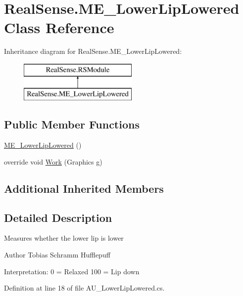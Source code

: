 \hypertarget{class_real_sense_1_1_m_e___lower_lip_lowered}{}\section{Real\+Sense.\+M\+E\+\_\+\+Lower\+Lip\+Lowered Class Reference}
\label{class_real_sense_1_1_m_e___lower_lip_lowered}
Inheritance diagram for Real\+Sense.\+M\+E\+\_\+\+Lower\+Lip\+Lowered\+:\begin{figure}[H]
\begin{center}
\leavevmode
\includegraphics[height=2.000000cm]{class_real_sense_1_1_m_e___lower_lip_lowered}
\end{center}
\end{figure}
\subsection*{Public Member Functions}
\begin{DoxyCompactItemize}
\item 
\hyperlink{class_real_sense_1_1_m_e___lower_lip_lowered_a22e97475320ef8a737cc1ce83dc0f93f}{M\+E\+\_\+\+Lower\+Lip\+Lowered} ()
\item 
override void \hyperlink{class_real_sense_1_1_m_e___lower_lip_lowered_a9b88f1f4e25e5330a561edbaf307889b}{Work} (Graphics g)
\end{DoxyCompactItemize}
\subsection*{Additional Inherited Members}


\subsection{Detailed Description}
Measures whether the lower lip is lower \begin{DoxyAuthor}{Author}
Tobias Schramm  Hufflepuff
\end{DoxyAuthor}
Interpretation\+: 0 = Relaxed 100 = Lip down 

Definition at line 18 of file A\+U\+\_\+\+Lower\+Lip\+Lowered.\+cs.



